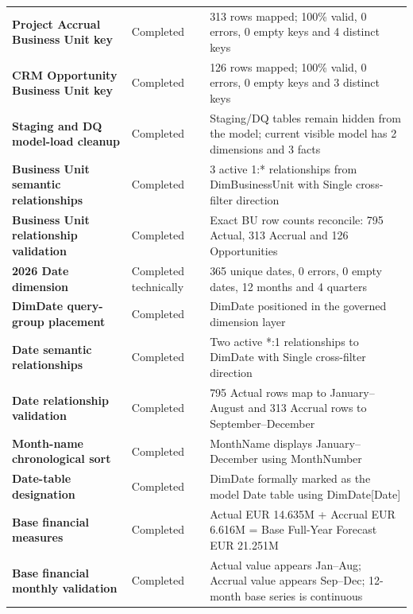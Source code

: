 \documentclass[11pt,a4paper]{article}
\begin{document}
\begin{tabularx}{\textwidth}{
    >{\bfseries}p{5.8cm}
    p{2.8cm}
    X
}
Project Accrual Business Unit key
&
Completed
&
313 rows mapped; 100\% valid, 0 errors, 0 empty keys and 4 distinct keys
\\

CRM Opportunity Business Unit key
&
Completed
&
126 rows mapped; 100\% valid, 0 errors, 0 empty keys and 3 distinct keys
\\

Staging and DQ model-load cleanup
&
Completed
&
Staging/DQ tables remain hidden from the model; current visible model has 2 dimensions and 3 facts
\\

Business Unit semantic relationships
&
Completed
&
3 active 1:* relationships from DimBusinessUnit with Single cross-filter direction
\\

Business Unit relationship validation
&
Completed
&
Exact BU row counts reconcile: 795 Actual, 313 Accrual and 126 Opportunities
\\

2026 Date dimension
&
Completed technically
&
365 unique dates, 0 errors, 0 empty dates, 12 months and 4 quarters
\\

DimDate query-group placement
&
Completed
&
DimDate positioned in the governed dimension layer
\\

Date semantic relationships
&
Completed
&
Two active *:1 relationships to DimDate with Single cross-filter direction
\\

Date relationship validation
&
Completed
&
795 Actual rows map to January--August and 313 Accrual rows to September--December
\\

Month-name chronological sort
&
Completed
&
MonthName displays January--December using MonthNumber
\\

Date-table designation
&
Completed
&
DimDate formally marked as the model Date table using DimDate[Date]
\\

Base financial measures
&
Completed
&
Actual EUR 14.635M + Accrual EUR 6.616M = Base Full-Year Forecast EUR 21.251M
\\

Base financial monthly validation
&
Completed
&
Actual value appears Jan--Aug; Accrual value appears Sep--Dec; 12-month base series is continuous
\\


\end{tabularx}
\end{document}
